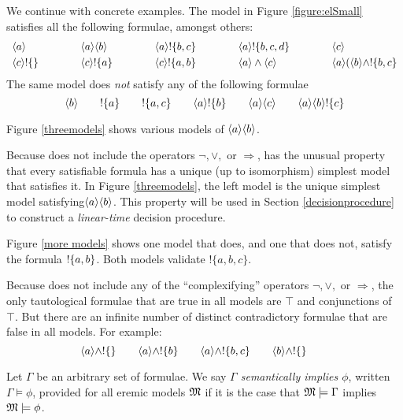 

We continue with concrete examples.  The model in Figure
\ref{figure:elSmall} satisfies all the following formulae, amongst
others:
\[
\begin{array}{lclclclcl}
\MAY{a} &\qquad&
\MAY{a} \MAY{b} &\qquad&
\MAY{a} \fBang \{b,c\} &\qquad&
\MAY{a} \fBang \{b,c,d\} &\qquad&
\MAY{c} \\[1mm]
\MAY{c} \fBang \{\} &&
\MAY{c} \fBang \{a\} &&
\MAY{c} \fBang \{a,b\} &&
\MAY{a} \land \MAY{c} &&
\MAY{a} (\MAY{b} \land \fBang \{b,c\}
\end{array}
\]
The same model does \emph{not} satisfy any of the following formulae
\[
\langle b \rangle \qquad
! \{a\} \qquad
! \{a, c\} \qquad
\langle a \rangle ! \{b\} \qquad
\langle a \rangle \langle c \rangle \qquad
\langle a \rangle \langle b \rangle ! \{c\} 
\]

\NI Figure \ref{threemodels} shows various models of $\MAY{a} \MAY{b}$. 

Because \ELABR{} does not include the operators $\neg, \lor, $ or
$\Rightarrow$, \ELABR{} has the unusual property that every
satisfiable formula has a unique (up to isomorphism) simplest model
that satisfies it.  In Figure \ref{threemodels}, the left model is the
unique simplest model satisfying$\MAY{a} \MAY{b}$.  This property will
be used in Section \ref{decisionprocedure} to construct a
\emph{linear-time} decision procedure.


Figure \ref{more models} shows one model that does, and one that does
not, satisfy the formula $! \{a,b\}$.  Both models validate
$!\{a, b, c\}$.



Because \ELABR{} does not include any of the ``complexifying''
operators $\neg, \lor, $ or $\Rightarrow$, the only tautological
formulae that are true in all models are $\top$ and conjunctions of
$\top$.  But there are an infinite number of distinct contradictory
formulae that are false in all models.  For example:
\[
   \langle a \rangle \land ! \{\} \qquad
   \langle a \rangle \land ! \{b\} \qquad
   \langle a \rangle \land ! \{b, c\} \qquad
   \langle b \rangle \land ! \{\} \qquad
\]

\begin{definition}
Let $\Gamma$ be an arbitrary set of formulae. We say \emph{$\Gamma$
  semantically implies $\phi$}, written $\Gamma \models \phi$,
provided for all eremic models $\frak{M}$ if it is the case that $\frak{M}
\models \Gamma$ implies $\frak{M} \models \phi$. 
\end{definition}

